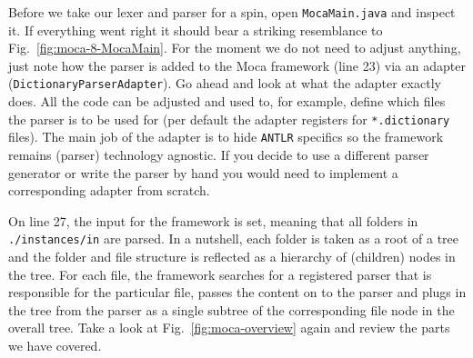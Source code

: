Before we take our lexer and parser for a spin, open \texttt{MocaMain.java} and inspect it.
If everything went right it should bear a striking resemblance to Fig.~\ref{fig:moca-8-MocaMain}.
For the moment we do not need to adjust anything, just note how the parser is added to the Moca framework (line 23) via an adapter (\texttt{Dictionary\-Parser\-Adapter}).
Go ahead and look at what the adapter exactly does.
All the code can be adjusted and used to, for example, define which files the parser is to be used for (per default the adapter registers for \texttt{*.dictionary} files).
The main job of the adapter is to hide \texttt{ANTLR} specifics so the framework remains (parser) technology agnostic.
If you decide to use a different parser generator or write the parser by hand you would need to implement a corresponding adapter from scratch.

On line 27, the input for the framework is set, meaning that all folders in \texttt{./instances/in} are parsed.
In a nutshell, each folder is taken as a root of a tree and the folder and file structure is reflected as a hierarchy of (children) nodes in the tree.
For each file, the framework searches for a registered parser that is responsible for the particular file, passes the content on to the parser and plugs in the tree from the parser as a single subtree of the corresponding file node in the overall tree.  Take a look at Fig.~\ref{fig:moca-overview} again and review the parts we have covered.

